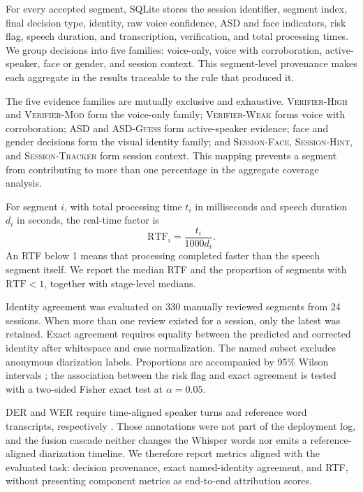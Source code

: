 \documentclass[conference]{IEEEtran}
\begin{document}
For every accepted segment, SQLite stores the session identifier,
segment index, final decision type, identity, raw voice confidence,
ASD and face indicators, risk flag, speech duration, and transcription,
verification, and total processing times. We group decisions into five
families: voice-only, voice with corroboration, active-speaker, face or
gender, and session context. This segment-level provenance makes each
aggregate in the results traceable to the rule that produced it.

The five evidence families are mutually exclusive and exhaustive.
\textsc{Verifier-High} and \textsc{Verifier-Mod} form the voice-only
family; \textsc{Verifier-Weak} forms voice with corroboration;
\textsc{ASD} and \textsc{ASD-Guess} form active-speaker evidence;
face and gender decisions form the visual identity family; and
\textsc{Session-Face}, \textsc{Session-Hint}, and
\textsc{Session-Tracker} form session context. This mapping prevents a
segment from contributing to more than one percentage in the aggregate
coverage analysis.

For segment $i$, with total processing time $t_i$ in milliseconds and
speech duration $d_i$ in seconds, the real-time factor is
\begin{equation}
    \mathrm{RTF}_i=\frac{t_i}{1000d_i}.
\end{equation}
An RTF below 1 means that processing completed faster than the speech
segment itself. We report the median RTF and the proportion of segments
with $\mathrm{RTF}<1$, together with stage-level medians.

Identity agreement was evaluated on 330 manually reviewed segments
from 24 sessions. When more than one review existed for a session, only
the latest was retained. Exact agreement requires equality between the
predicted and corrected identity after whitespace and case
normalization. The named subset excludes anonymous diarization labels.
Proportions are accompanied by 95\% Wilson intervals
\cite{wilson1927}; the association between the risk flag and exact
agreement is tested with a two-sided Fisher exact test at
$\alpha=0.05$.

DER and WER require time-aligned speaker turns and reference word
transcripts, respectively \cite{bredin2017metrics}. Those annotations
were not part of the deployment log, and the fusion cascade neither
changes the Whisper words nor emits a reference-aligned diarization
timeline. We therefore report metrics aligned with the evaluated task:
decision provenance, exact named-identity agreement, and RTF, without
presenting component metrics as end-to-end attribution scores.
\end{document}
